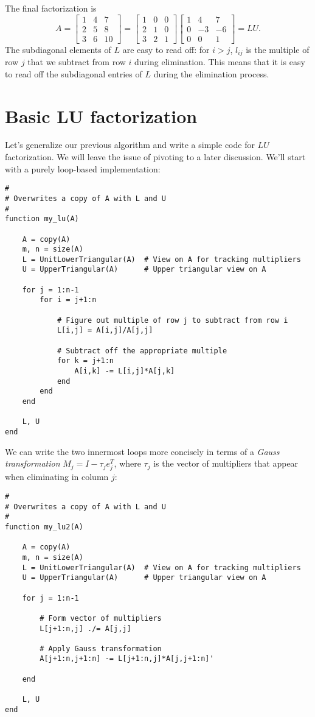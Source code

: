 \documentclass[12pt, leqno]{article}
\begin{document}
The final factorization is
\[
A =
\begin{bmatrix} 1 & 4 & 7 \\ 2 & 5 & 8 \\ 3 & 6 & 10 \end{bmatrix} =
\begin{bmatrix} 1 & 0 & 0 \\ 2 & 1 & 0 \\ 3 & 2 & 1 \end{bmatrix}
\begin{bmatrix} 1 & 4 & 7 \\ 0 & -3 & -6 \\ 0 & 0 & 1 \end{bmatrix} = LU.
\]
The subdiagonal elements of $L$ are easy to read off: for $i > j$, 
$l_{ij}$ is the multiple of row $j$ that we subtract from row
$i$ during elimination.  This means that it is easy to read off the
subdiagonal entries of $L$ during the elimination process.

\section{Basic LU factorization}

Let's generalize our previous algorithm and write a simple code for
$LU$ factorization.  We will leave the issue of pivoting to a later
discussion.  We'll start with a purely loop-based implementation:
\begin{lstlisting}
#
# Overwrites a copy of A with L and U
#
function my_lu(A)

	A = copy(A)
	m, n = size(A)
	L = UnitLowerTriangular(A)  # View on A for tracking multipliers
	U = UpperTriangular(A)      # Upper triangular view on A

	for j = 1:n-1
		for i = j+1:n

			# Figure out multiple of row j to subtract from row i
			L[i,j] = A[i,j]/A[j,j]

			# Subtract off the appropriate multiple
			for k = j+1:n
				A[i,k] -= L[i,j]*A[j,k]
			end
		end
	end

	L, U
end
\end{lstlisting}
We can write the two innermost loops more concisely in
terms of a {\em Gauss transformation} $M_j = I - \tau_j e_j^T$,
where $\tau_j$ is the vector of multipliers that appear when
eliminating in column $j$:
\begin{lstlisting}
#
# Overwrites a copy of A with L and U
#
function my_lu2(A)

	A = copy(A)
	m, n = size(A)
	L = UnitLowerTriangular(A)  # View on A for tracking multipliers
	U = UpperTriangular(A)      # Upper triangular view on A

	for j = 1:n-1
		
		# Form vector of multipliers
		L[j+1:n,j] ./= A[j,j]

		# Apply Gauss transformation
		A[j+1:n,j+1:n] -= L[j+1:n,j]*A[j,j+1:n]'
		
	end

	L, U
end
\end{lstlisting}
\end{document}
